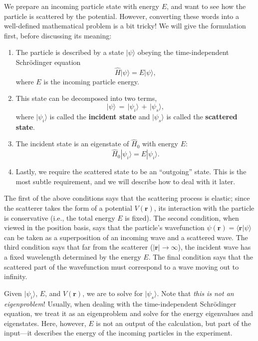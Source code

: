 \documentclass[pra,12pt]{revtex4}
\begin{document}
We prepare an incoming particle state with energy $E$, and want to see
how the particle is scattered by the potential.  However, converting
these words into a well-defined mathematical problem is a bit tricky!
We will give the formulation first, before discussing its meaning:
\begin{enumerate}
\item 
The particle is described by a state $|\psi\rangle$ obeying the
time-independent Schr\"odinger equation
$$\hat{H} |\psi\rangle = E |\psi\rangle,$$
where $E$ is the incoming particle energy.

\item
This state can be decomposed into two terms,
$$|\psi\rangle \,=\, |\psi_i\rangle \,+\, |\psi_s\rangle,$$
where $|\psi_i\rangle$ is called the \textbf{incident state} and
$|\psi_s\rangle$ is called the \textbf{scattered state}.

\item
The incident state is an eigenstate of $\hat{H}_0$ with energy $E$:
$$\hat{H}_0 |\psi_i\rangle = E |\psi_i\rangle.$$

\item
Lastly, we require the scattered state to be an ``outgoing'' state.
This is the most subtle requirement, and we will describe how to deal
with it later.
\end{enumerate}
The first of the above conditions says that the scattering process is
elastic; since the scatterer takes the form of a potential
$V(\mathbf{r})$, its interaction with the particle is conservative
(i.e., the total energy $E$ is fixed).  The second condition, when
viewed in the position basis, says that the particle's wavefunction
$\psi(\mathbf{r}) = \langle \mathbf{r} |\psi\rangle$ can be taken as a
superposition of an incoming wave and a scattered wave.  The third
condition says that far from the scatterer ($|\mathbf{r}|\rightarrow
\infty$), the incident wave has a fixed wavelength determined by the
energy $E$.  The final condition says that the scattered part of the
wavefunction must correspond to a wave moving out to infinity.

Given $|\psi_i\rangle$, $E$, and $V(\mathbf{r})$, we are to solve for
$|\psi_s\rangle$.  Note that \textit{this is not an eigenproblem}!
Usually, when dealing with the time-independent Schr\"odinger
equation, we treat it as an eigenproblem and solve for the energy
eigenvalues and eigenstates.  Here, however, $E$ is not an output of
the calculation, but part of the input---it describes the energy of
the incoming particles in the experiment.
\end{document}
